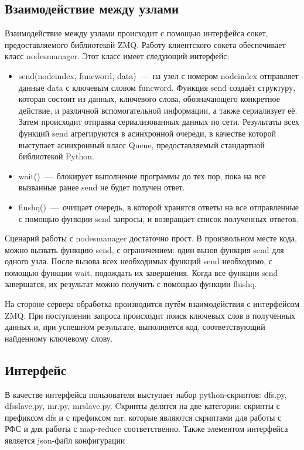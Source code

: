 \documentclass[12pt,a4paper,oneside]{extarticle}
\begin{document}
    \subsection{Взаимодействие между узлами}
        Взаимодействие между узлами происходит с помощью интерфейса сокет, предоставляемого библиотекой ZMQ.
        Работу клиентского сокета обеспечивает класс nodes\textunderscore manager. Этот класс имеет следующий интерфейс:
        \begin{itemize}
            \item send(node\textunderscore index, func\textunderscore word, data)~---~на узел с номером node\textunderscore index отправляет данные data с ключевым словом func\textunderscore word. Функция send создаёт структуру, которая состоит из данных, ключевого слова, обозначающего конкретное действие, и различной вспомогательной информации, а также сериализует её. Затем происходит отправка сериализованных данных по сети. Результаты всех функций send агрегируются в асинхронной очереди, в качестве которой выступает асинхронный класс Queue, предоставляемый стандартной библиотекой Python.
            \item wait()~---~блокирует выполнение программы до тех пор, пока на все вызванные ранее send не будет получен ответ.
            \item flush\textunderscore q()~---~очищает очередь, в которой хранятся ответы на все отправленные с помощью функции send запросы, и возвращает список полученных ответов.
        \end{itemize}

        Сценарий работы с nodes\textunderscore manager достаточно прост. В произвольном месте кода, можно вызвать функцию send, с ограничением: один вызов функция send для одного узла. После вызова всех необходимых функций send необходимо, с помощью функции wait, подождать их завершения. Когда все функции send завершатся, их результат можно получить с помощью функции flush\textunderscore q.

        На стороне сервера обработка производится путём взаимодействия с интерфейсом ZMQ. При поступлении запроса происходит поиск ключевых слов в полученных данных и, при успешном результате, выполняется код, соответствующий найденному ключевому слову.

    \subsection{Интерфейс}

        В качестве интерфейса пользователя выступает набор python-скриптов: dfs.py, dfs\textunderscore slave.py, mr.py, mr\textunderscore slave.py.
        Cкрипты делятся на две категории: скрипты с префиксом dfs и с префиксом mr, которые являются скриптами для работы с РФС и для работы с map-reduce соответственно.
        Также элементом интерфейса является json-файл конфигурации
\end{document}

